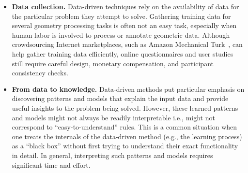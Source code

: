 {\begin{itemize}
to data-driven methods, or in other words, to perform co-analysis of image and shape
data. We discuss this issue as one important future research direction for further
development in data-driven methods in the next section.
\vspace{6pt}
\item {\bf Data collection.} Data-driven techniques rely on the availability of data for the particular problem they attempt to solve. Gathering training data for several geometry processing tasks is often not an easy task, especially when human labor is involved to process or annotate geometric data.  Although crowdsourcing Internet marketplaces, such as Amazon Mechanical Turk~\cite{amt09}, can help gather training data efficiently, online questionnaires and user studies still require careful design, monetary compensation, and participant consistency checks.
    \vspace{6pt}
\item {\bf From data to knowledge.}
    Data-driven methods put particular emphasis on discovering patterns and models that explain the input data and provide useful insights to the problem being
solved. However, these learned patterns and models might not always be readily interpretable  i.e., might not correspond to ``easy-to-understand'' rules. This
 is a common situation when one treats the internals of the data-driven method (e.g.,
the learning process) as a ``black box'' without first  trying to understand their exact
functionality in detail. In general, interpreting such patterns and models requires significant time and effort.
\end{itemize}
}%







